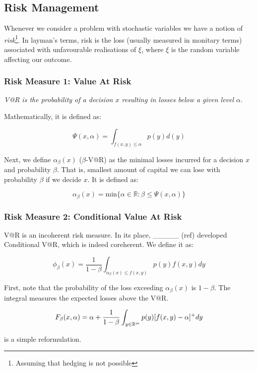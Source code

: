\subsection{Risk Management}

Whenever we consider a problem with stochastic variables we have a notion of \textit{risk}\footnote{Assuming that hedging is not
possible}. In layman's terms, risk is the loss (usually measured in monitary terms) associated with unfavourable realisations of
$\xi$, where $\xi$ is the random variable affecting our outcome.\\

\subsubsection{Risk Measure 1: Value At Risk}

\emph{V@R is the probability of a decision $x$ resulting in losses below a given level $\alpha$}.


Mathematically, it is defined as:

\[
\Psi(x,\alpha) = \int_{f(x,y) \leq \alpha} p(y) d(y)
\]

Next, we define $\alpha_\beta (x)$ ($\beta$-V@R) as the minimal losses incurred for a decision $x$ and probability $\beta$. That is,
smallest amount of capital we can lose with probability $\beta$ if we decide $x$. It is defined as:

\[
\alpha_\beta(x) = \text{min} \{ \alpha \in \mathbb{R} : \beta \leq \Psi(x,\alpha)\}
\]

\subsubsection{Risk Measure 2: Conditional Value At Risk}

V@R is an incoherent risk measure. In its place, \_\_\_\_\_ (ref) developed Conditional V@R, which is 
indeed coreherent. We define it as:

\[
\phi_\beta(x) = \frac{1}{1-\beta} \int_{\alpha_\beta(x) \leq f(x,y)} p(y)f(x,y) dy
\]

First, note that the probability of the loss exceeding $\alpha_\beta(x)$ is $1-\beta$. The integral
measures the expected losses above the V@R.


\[
F_\beta(x,\alpha) = \alpha + \frac{1}{1-\beta} \int_{y\in \mathbb{R}^m} p(y)\large[f(x,y) -\alpha\large]^+ dy
\]

is a simple reformulation.
